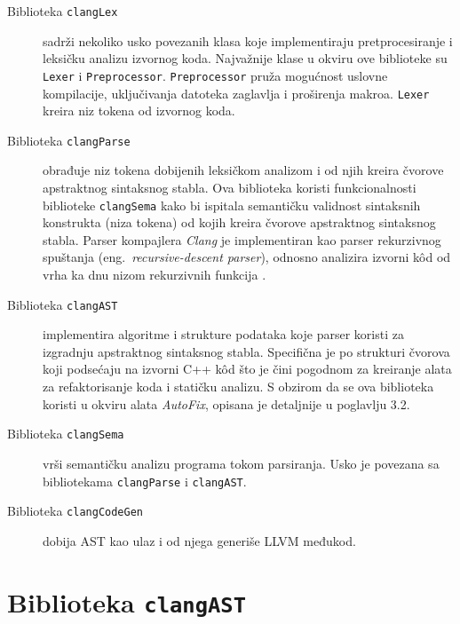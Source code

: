 \documentclass[12pt,oneside]{memoir}
\begin{document}
\begin{description}
  \item[Biblioteka \texttt{clangLex}] sadr\v{z}i nekoliko usko povezanih klasa koje implementiraju pretprocesiranje i leksi\v{c}ku analizu izvornog koda. Najva\v{z}nije klase u okviru ove biblioteke
       su \texttt{Lexer} i  \texttt{Preprocessor}.
       \texttt{Preprocessor} pru\v{z}a mogućnost uslovne kompilacije, uključivanja datoteka zaglavlja i proširenja makroa.
       \texttt{Lexer} kreira niz tokena od izvornog koda.
  \item[Biblioteka \texttt{clangParse}]
        obrađuje niz tokena dobijenih leksi\v{c}kom analizom i od njih kreira \v{c}vorove apstraktnog sintaksnog stabla. Ova biblioteka koristi funkcionalnosti 
        biblioteke \texttt{clangSema} kako bi ispitala semanti\v{c}ku validnost sintaksnih konstrukta (niza tokena) od kojih kreira \v{c}vorove apstraktnog sintaksnog stabla.
        Parser kompajlera \textit{Clang} je implementiran kao parser rekurzivnog spuštanja (eng.~\textit{recursive-descent parser}), odnosno analizira izvorni k\^{o}d od vrha ka dnu nizom rekurzivnih funkcija \cite{LLVMCoreLibraries}.
  \item[Biblioteka \texttt{clangAST}]
        implementira algoritme i strukture podataka koje parser koristi za izgradnju apstraktnog sintaksnog stabla. Specifična je po strukturi čvorova koji podsećaju na izvorni C++ k\^{o}d što je čini pogodnom za kreiranje alata za refaktorisanje koda i statičku analizu. S obzirom da se ova biblioteka koristi u okviru alata \textit{AutoFix}, opisana je detaljnije u poglavlju 3.2.
  \item[Biblioteka \texttt{clangSema}]
        vrši semantičku analizu programa tokom parsiranja. Usko je povezana sa bibliotekama \texttt{clangParse} i \texttt{clangAST}.
  \item[Biblioteka \texttt{clangCodeGen}]
        dobija AST kao ulaz i od njega generiše LLVM međukod.
\end{description}


\section{Biblioteka \texttt{clangAST}}
\end{document}
